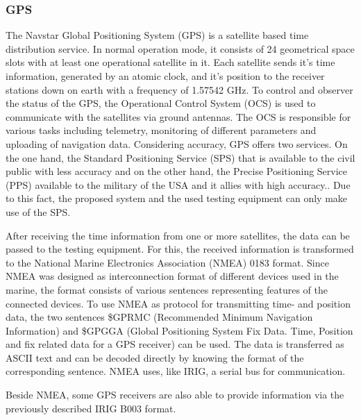 \subsubsection{GPS}
The Navstar Global Positioning System (GPS) is a satellite based time distribution service. In normal operation mode, it consists of 24 geometrical space slots with at least one operational satellite in it. Each satellite sends it's time information, generated by an atomic clock, and it's position to the receiver stations down on earth with a frequency of 1.57542 GHz. To control and observer the status of the GPS, the Operational Control System (OCS) is used to communicate with the satellites via ground antennas. The OCS is responsible for various tasks including telemetry, monitoring of different parameters and uploading of navigation data. Considering accuracy, GPS offers two services. On the one hand, the Standard Positioning Service (SPS) that is available to the civil public with less accuracy and on the other hand, the Precise Positioning Service (PPS) available to the military of the USA and it allies with high accuracy.\cite{gps}. Due to this fact, the proposed system and the used testing equipment can only make use of the SPS.


After receiving the time information from one or more satellites, the data can be passed to the testing equipment. For this, the received information is transformed to the National Marine Electronics Association (NMEA) 0183 format. Since NMEA was designed as interconnection format of different devices used in the marine, the format consists of various sentences representing features of the connected devices. To use NMEA as protocol for transmitting time- and position data, the two sentences \$GPRMC (Recommended Minimum Navigation Information) and \$GPGGA (Global Positioning System Fix Data. Time, Position and fix related data for a GPS receiver) can be used. The data is transferred as ASCII text and can be decoded directly by knowing the format of the corresponding sentence. NMEA uses, like IRIG, a serial bus for communication\cite{nmea}.

Beside NMEA, some GPS receivers are also able to provide information via the previously described IRIG B003 format.

